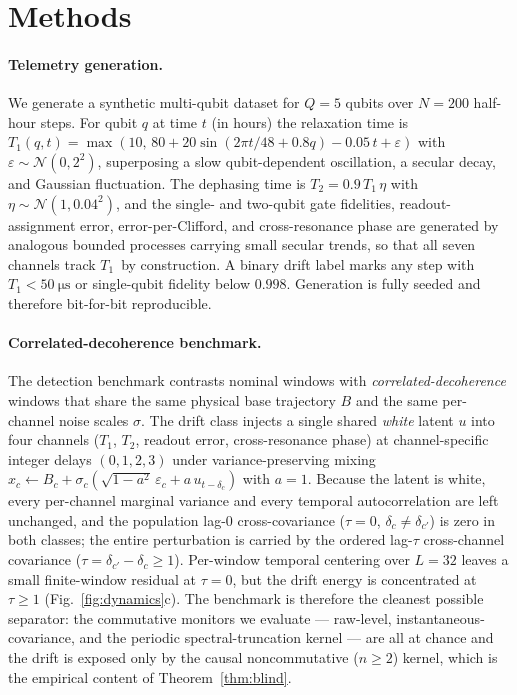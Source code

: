 \documentclass[
  aps,
  prresearch,
  reprint,
  amsmath,
  amssymb,
  nofootinbib,
  floatfix,
]{revtex4-2}
\newcommand{\T}{\ensuremath{T_1}}
\newcommand{\Ttwo}{\ensuremath{T_2}}
\begin{document}
\section{Methods}

\paragraph{Telemetry generation.}
We generate a synthetic multi-qubit dataset for $Q=5$ qubits over $N=200$ half-hour
steps. For qubit $q$ at time $t$ (in hours) the relaxation time is
$T_1(q,t)=\max(10,\,80+20\sin(2\pi t/48+0.8q)-0.05\,t+\varepsilon)$ with
$\varepsilon\sim\mathcal{N}(0,2^2)$, superposing a slow qubit-dependent oscillation,
a secular decay, and Gaussian fluctuation. The dephasing time is
$T_2=0.9\,T_1\,\eta$ with $\eta\sim\mathcal{N}(1,0.04^2)$, and the single- and
two-qubit gate fidelities, readout-assignment error, error-per-Clifford, and
cross-resonance phase are generated by analogous bounded processes carrying small
secular trends, so that all seven channels track \T\ by construction. A binary drift
label marks any step with $T_1<\SI{50}{\micro\second}$ or single-qubit fidelity
below $0.998$. Generation is fully seeded and therefore bit-for-bit reproducible.

\paragraph{Correlated-decoherence benchmark.}
The detection benchmark contrasts nominal windows with
\emph{correlated-decoherence} windows that share the same physical base trajectory
$B$ and the same per-channel noise scales $\sigma$. The drift class injects a single
shared \emph{white} latent $u$ into four channels (\T, \Ttwo, readout error,
cross-resonance phase) at channel-specific integer delays $(0,1,2,3)$ under
variance-preserving mixing
$x_c\leftarrow B_c+\sigma_c(\sqrt{1-a^2}\,\varepsilon_c+a\,u_{t-\delta_c})$ with
$a=1$. Because the latent is white, every per-channel marginal variance and every
temporal autocorrelation are left unchanged, and the population lag-$0$
cross-covariance ($\tau=0$, $\delta_c\neq\delta_{c'}$) is zero in both classes; the
entire perturbation is carried by the ordered lag-$\tau$ cross-channel covariance
($\tau=\delta_{c'}-\delta_c\ge1$). Per-window temporal centering over $L=32$ leaves a
small finite-window residual at $\tau=0$, but the drift energy is concentrated at
$\tau\ge1$ (Fig.~\ref{fig:dynamics}c). The benchmark is therefore the cleanest
possible separator: the commutative monitors we evaluate --- raw-level,
instantaneous-covariance, and the periodic spectral-truncation kernel --- are all at
chance and the drift is exposed only by the causal noncommutative ($n\ge2$) kernel,
which is the empirical content of Theorem~\ref{thm:blind}.
\end{document}
